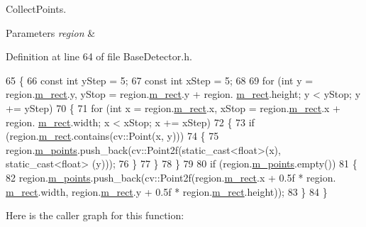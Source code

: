 Collect\+Points. 


\begin{DoxyParams}{Parameters}
{\em region} & \\
\hline
\end{DoxyParams}


Definition at line 64 of file Base\+Detector.\+h.


\begin{DoxyCode}
65     \{
66         \textcolor{keyword}{const} \textcolor{keywordtype}{int} yStep = 5;
67         \textcolor{keyword}{const} \textcolor{keywordtype}{int} xStep = 5;
68 
69         \textcolor{keywordflow}{for} (\textcolor{keywordtype}{int} y = region.\mbox{\hyperlink{class_c_region_a6f68304e90428db829cc38792fa3e1e8}{m\_rect}}.y, yStop = region.\mbox{\hyperlink{class_c_region_a6f68304e90428db829cc38792fa3e1e8}{m\_rect}}.y + region.
      \mbox{\hyperlink{class_c_region_a6f68304e90428db829cc38792fa3e1e8}{m\_rect}}.height; y < yStop; y += yStep)
70         \{
71             \textcolor{keywordflow}{for} (\textcolor{keywordtype}{int} x = region.\mbox{\hyperlink{class_c_region_a6f68304e90428db829cc38792fa3e1e8}{m\_rect}}.x, xStop = region.\mbox{\hyperlink{class_c_region_a6f68304e90428db829cc38792fa3e1e8}{m\_rect}}.x + region.
      \mbox{\hyperlink{class_c_region_a6f68304e90428db829cc38792fa3e1e8}{m\_rect}}.width; x < xStop; x += xStep)
72             \{
73                 \textcolor{keywordflow}{if} (region.\mbox{\hyperlink{class_c_region_a6f68304e90428db829cc38792fa3e1e8}{m\_rect}}.contains(cv::Point(x, y)))
74                 \{
75                     region.\mbox{\hyperlink{class_c_region_a65be08ae81a8d174d95ae35a2f7fb212}{m\_points}}.push\_back(cv::Point2f(static\_cast<float>(x), static\_cast<float>
      (y)));
76                 \}
77             \}
78         \}
79 
80         \textcolor{keywordflow}{if} (region.\mbox{\hyperlink{class_c_region_a65be08ae81a8d174d95ae35a2f7fb212}{m\_points}}.empty())
81         \{
82             region.\mbox{\hyperlink{class_c_region_a65be08ae81a8d174d95ae35a2f7fb212}{m\_points}}.push\_back(cv::Point2f(region.\mbox{\hyperlink{class_c_region_a6f68304e90428db829cc38792fa3e1e8}{m\_rect}}.x + 0.5f * region.
      \mbox{\hyperlink{class_c_region_a6f68304e90428db829cc38792fa3e1e8}{m\_rect}}.width, region.\mbox{\hyperlink{class_c_region_a6f68304e90428db829cc38792fa3e1e8}{m\_rect}}.y + 0.5f * region.\mbox{\hyperlink{class_c_region_a6f68304e90428db829cc38792fa3e1e8}{m\_rect}}.height));
83         \}
84     \}
\end{DoxyCode}
Here is the caller graph for this function\+:\nopagebreak
